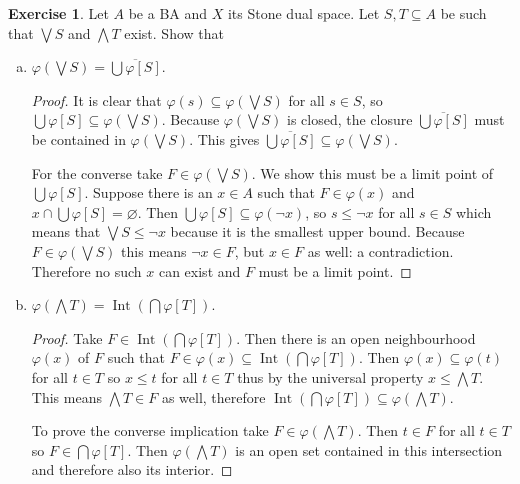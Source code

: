 \documentclass{article}
\DeclareMathOperator{\inter}{Int}
\theoremstyle{definition}
\newtheorem{question}{Exercise}
\begin{document}
\begin{question}
    Let \(A\) be a BA and \(X\) its Stone dual space. Let \(S,T\subseteq A\) be
    such that \(\bigvee S\) and \(\bigwedge T\) exist. Show that
    \begin{enumerate}[a)]
        \item \(\varphi(\bigvee S)=\overline{\bigcup\varphi[S]}\).

              \begin{proof}
                  It is clear that \(\varphi(s)\subseteq\varphi(\bigvee S)\) for
                  all \(s\in S\), so \(\bigcup\varphi[S]\subseteq\varphi(\bigvee
                  S)\). Because \(\varphi(\bigvee S)\) is closed, the closure
                  \(\overline{\bigcup\varphi[S]}\) must be contained in
                  \(\varphi(\bigvee S)\). This gives
                  \(\overline{\bigcup\varphi[S]}\subseteq\varphi(\bigvee S)\).

                  For the converse take \(F\in\varphi(\bigvee S)\). We show this
                  must be a limit point of \(\bigcup\varphi[S]\). Suppose there
                  is an \(x\in A\) such that \(F\in\varphi(x)\) and
                  \(x\cap\bigcup\varphi[S]=\varnothing\). Then
                  \(\bigcup\varphi[S]\subseteq\varphi(\neg x)\), so \(s\leq\neg
                  x\) for all \(s\in S\) which means that \(\bigvee S\leq\neg
                  x\) because it is the smallest upper bound. Because
                  \(F\in\varphi(\bigvee S)\) this means \(\neg x\in F\), but
                  \(x\in F\) as well: a contradiction. Therefore no such \(x\)
                  can exist and \(F\) must be a limit point.
              \end{proof}

        \item \(\varphi(\bigwedge T)=\inter(\bigcap\varphi[T])\).

              \begin{proof}
                  Take \(F\in\inter(\bigcap\varphi[T])\). Then there is an open
                  neighbourhood \(\varphi(x)\) of \(F\) such that
                  \(F\in\varphi(x)\subseteq\inter(\bigcap\varphi[T])\). Then
                  \(\varphi(x)\subseteq\varphi(t)\) for all \(t\in T\) so
                  \(x\leq t\) for all \(t\in T\) thus by the universal property
                  \(x\leq\bigwedge T\). This means \(\bigwedge T\in F\) as well,
                  therefore
                  \(\inter(\bigcap\varphi[T])\subseteq\varphi(\bigwedge T)\).

                  To prove the converse implication take \(F\in\varphi(\bigwedge
                  T)\). Then \(t\in F\) for all \(t\in T\) so
                  \(F\in\bigcap\varphi[T]\). Then \(\varphi(\bigwedge T)\) is an
                  open set contained in this intersection and therefore also its
                  interior.
              \end{proof}
    \end{enumerate}
\end{question}
\end{document}
